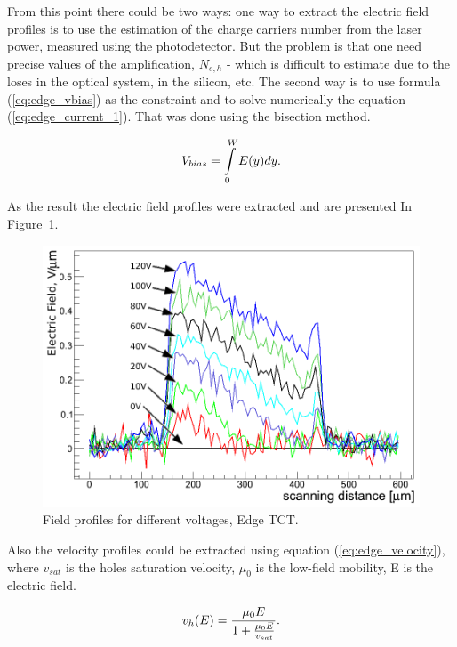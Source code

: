 \documentclass[12pt,oneside,notitlepage,abstracton,a4paper]{scrartcl}
\begin{document}
From this point there could be two ways: one way to extract the electric field profiles is to use the estimation of the charge carriers number from the laser power, measured using the photodetector. But the problem is that one need precise values of the amplification, $N_{e,h}$ - which is difficult to estimate due to the loses in the optical system, in the silicon, etc. The second way is to use formula (\ref{eq:edge_vbias}) as the constraint and to solve numerically the equation (\ref{eq:edge_current_1}). That was done using the bisection method\cite{bib:bisec}. 

\begin{equation}
    \centering
    V_{bias} = \int\limits_0^W E(y) dy.
    \label{eq:edge_vbias}
\end{equation}

\noindent As the result the electric field profiles were extracted and are presented In Figure~\ref{fig:edge_field_profiles}. 

\begin{figure}[h]
    \centering
    \includegraphics[width=12cm]{pics/edge_field}
    \caption{Field profiles for different voltages, Edge TCT.}
    \label{fig:edge_field_profiles}
\end{figure}

Also the velocity profiles could be extracted using equation (\ref{eq:edge_velocity}), where $v_{sat}$ is the holes saturation velocity, $\mu_0$ is the low-field mobility, E is the electric field.

\begin{equation}
    \centering
    v_h(E) = \frac{\mu_0 E}{1+\frac{\mu_0 E}{v_{sat}}}.
    \label{eq:edge_velocity}
\end{equation}
\end{document}

